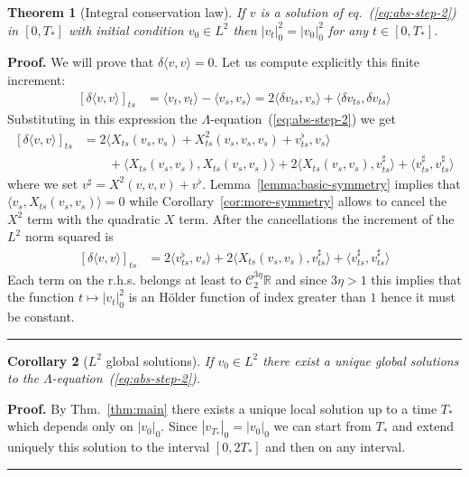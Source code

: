 \documentclass[a4paper,12pt,reqno]{article}
\newcommand{\der}{\delta}
\newcommand{\RR}{\mathbb{R}}
\newcommand{\CC}{\mathcal{C}}
\newtheorem{theorem}{Theorem}
\newtheorem{corollary}[theorem]{Corollary}
\newenvironment{proof}[1][Proof]{\textbf{#1.} }{\ \rule{0.5em}{0.5em}}
\begin{document}
\begin{theorem}[Integral conservation law]
If $v$ is a solution of eq.~(\ref{eq:abs-step-2}) in $[0,T_*]$ with initial condition $v_0 \in L^2$ then $|v_t|^2_0 = |v_0|_0^2$ for any $t \in [0,T_*]$.
\end{theorem}
\begin{proof}
We will prove that $\der \langle v,v \rangle  = 0$. Let us compute explicitly this finite increment:
\begin{equation*}
  \begin{split}
[\der \langle v,v \rangle]_{ts}  & = \langle v_t,v_t \rangle - \langle v_s,v_s \rangle
=  2 \langle \der v_{ts},v_s \rangle + \langle \der v_{ts},\der v_{ts} \rangle    
  \end{split}
\end{equation*}
Substituting in this expression the $\Lambda$-equation~(\ref{eq:abs-step-2}) we get
\begin{equation*}
  \begin{split}
[\der \langle v,v \rangle]_{ts}
& = 2  \langle X_{ts}(v_s,v_s)+X^2_{ts}(v_s,v_s,v_s) + v^\flat_{ts},v_s \rangle 
\\ & \qquad + \langle X_{ts}(v_s,v_s),X_{ts}(v_s,v_s) \rangle 
+ 2 \langle X_{ts}(v_s,v_s),v^{\sharp}_{ts} \rangle    
+  \langle v^{\sharp}_{ts},v^{\sharp}_{ts} \rangle    
  \end{split}
\end{equation*}
where we set $v^\sharp = X^2(v,v,v) +
v^\flat$. Lemma~\ref{lemma:basic-symmetry} implies that $\langle v_s,
X_{ts}(v_s,v_s) \rangle = 0$ while Corollary~\ref{cor:more-symmetry}
allows to cancel the $X^2$ term with the quadratic $X$ term. After the
cancellations the increment of the $L^2$ norm squared is  
\begin{equation*}
  \begin{split}
[\der \langle v,v \rangle]_{ts}
& = 2  \langle  v^\flat_{ts},v_s \rangle 
+ 2 \langle X_{ts}(v_s,v_s),v^{\sharp}_{ts} \rangle    
+  \langle v^{\sharp}_{ts},v^{\sharp}_{ts} \rangle    
  \end{split}
\end{equation*}
Each term  on the r.h.s. belongs at least to $\CC_2^{3\eta} \RR$ and
since $3\eta > 1$ this implies that the function $t \mapsto |v_t|^2_0$
is an H\"older function of index greater than $1$ hence it
must be constant.
\end{proof}


\begin{corollary}[$L^2$ global solutions]
If $v_0 \in L^2$ there exist a unique global solutions to the $\Lambda$-equation~(\ref{eq:abs-step-2}).  
\end{corollary}
\begin{proof}
By Thm.~\ref{thm:main} there exists a unique local solution up to a time
$T_*$ which depends only on $|v_0|_0$. Since $|v_{T_*}|_0 = |v_{0}|_0$
we can start from $T_*$ and extend uniquely this solution to the interval
$[0,2T_*]$ and then on any interval.
\end{proof}
\end{document}
